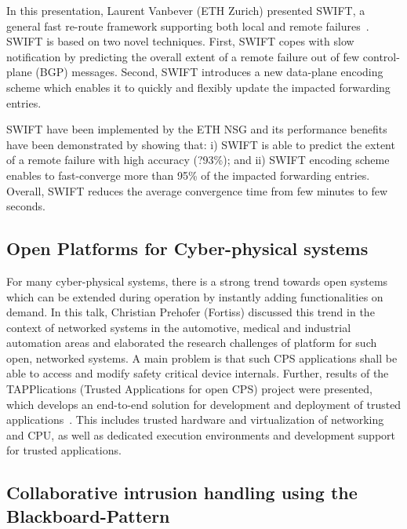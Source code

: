 In this presentation, Laurent Vanbever (ETH Zurich) presented SWIFT, a general
fast re-route framework supporting both local and remote failures~\cite{}.
SWIFT is based on two novel techniques. First, SWIFT copes with slow
notification by predicting the overall extent of a remote failure out of few
control-plane (BGP) messages. Second, SWIFT introduces a new data-plane
encoding scheme which enables it to quickly and flexibly update the impacted
forwarding entries.

SWIFT have been implemented by the ETH \ac{NSG} and its performance benefits
have been demonstrated by showing that: i) SWIFT is able to predict the extent
of a remote failure with high accuracy (?93\%); and ii) SWIFT encoding scheme
enables to fast-converge more than 95\% of the impacted forwarding entries.
Overall, SWIFT reduces the average convergence time from few minutes to few
seconds.


\subsection{Open Platforms for Cyber-physical systems}

For many cyber-physical systems, there is a strong trend towards open systems
which can be extended during operation by instantly adding functionalities on
demand. In this talk, Christian Prehofer (Fortiss) discussed this trend in the
context of networked systems in the automotive, medical and industrial
automation areas and elaborated the research challenges of platform for such
open, networked systems. A main problem is that such CPS applications shall be able to
access and modify safety critical device internals. Further, results of the
TAPPlications (Trusted Applications for open CPS) project were presented, which  develops an
end-to-end solution for development and deployment of trusted
applications~\cite{prehofer:eitec:2016}. This includes trusted hardware and
virtualization of networking and CPU, as well as dedicated execution
environments and development support for trusted applications.


\subsection{Collaborative intrusion handling using the Blackboard-Pattern}

